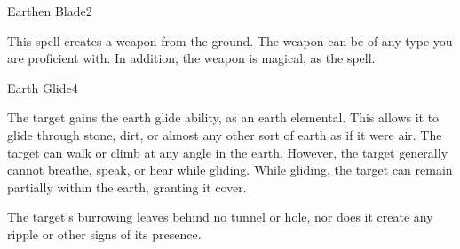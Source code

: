 \begin{spellsection}{Earthen Blade}{2}
\begin{spellheader}
\end{spellheader}
\begin{spellcontent}
    \begin{spelltargetinginfo}
    \end{spelltargetinginfo}
    \begin{spelleffects}
        \spelleffect This spell creates a weapon from the ground. The weapon can be of any type you are proficient with. In addition, the weapon is magical, as the  spell.
        \spelldur \durlong \dismissable
    \end{spelleffects}
\end{spellcontent}
\begin{spellfooter}
\end{spellfooter}
\end{spellsection}

\begin{spellsection}{Earth Glide}{4}
\begin{spellheader}
\end{spellheader}
\begin{spellcontent}
    \begin{spelltargetinginfo}
    \end{spelltargetinginfo}
    \begin{spelleffects}
        \spelleffect The target gains the earth glide ability, as an earth elemental. This allows it to glide through stone, dirt, or almost any other sort of earth as if it were air. The target can walk or climb at any angle in the earth. However, the target generally cannot breathe, speak, or hear while gliding. While gliding, the target can remain partially within the earth, granting it cover.
        \spelldur \durshort
    \end{spelleffects}
\end{spellcontent}
\begin{spellfooter}
    \spellnotes The target's burrowing leaves behind no tunnel or hole, nor does it create any ripple or other signs of its presence.
\end{spellfooter}
\end{spellsection}

